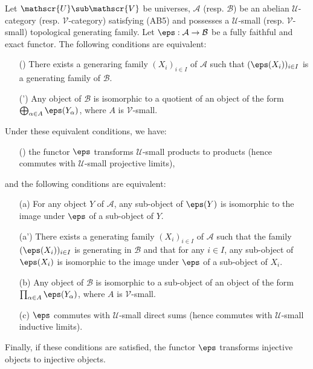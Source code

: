 \begin{proposition}\label{abelian category generaring family in universe prop}
Let $\mathscr{U}\sub\mathscr{V}$ be universes, $\mathcal{A}$ (resp. $\mathcal{B}$) be an abelian $\mathscr{U}$-category (resp. $\mathscr{V}$-category) satisfying (AB5) and possesses a $\mathscr{U}$-small (resp. $\mathscr{V}$-small) topological generating family. Let $\eps:\mathcal{A}\to \mathcal{B}$ be a fully faithful and exact functor. The following conditions are equivalent:
\begin{enumerate}
    \item[(\rmnum{1})] There exists a generaring family $(X_i)_{i\in I}$ of $\mathcal{A}$ such that $(\eps(X_i))_{i\in I}$ is a generating family of $\mathcal{B}$.
    \item[(\rmnum{1}')] Any object of $\mathcal{B}$ is isomorphic to a quotient of an object of the form $\bigoplus_{\alpha\in A}\eps(Y_\alpha)$, where $A$ is $\mathscr{V}$-small.
\end{enumerate}
Under these equivalent conditions, we have:
\begin{enumerate}
    \item[(\rmnum{2})] the functor $\eps$ transforms $\mathscr{U}$-small products to products (hence commutes with $\mathscr{U}$-small projective limits),
\end{enumerate}
and the following conditions are equivalent:
\begin{enumerate}
    \item[(a)] For any object $Y$ of $\mathcal{A}$, any sub-object of $\eps(Y)$ is isomorphic to the image under $\eps$ of a sub-object of $Y$.
    \item[(a')] There exists a generating family $(X_i)_{i\in I}$ of $\mathcal{A}$ such that the family $(\eps(X_i))_{i\in I}$ is generating in $\mathcal{B}$ and that for any $i\in I$, any sub-object of $\eps(X_i)$ is isomorphic to the image under $\eps$ of a sub-object of $X_i$.
    \item[(b)] Any object of $\mathcal{B}$ is isomorphic to a sub-object of an object of the form $\prod_{\alpha\in A}\eps(Y_\alpha)$, where $A$ is $\mathscr{V}$-small.
    \item[(c)] $\eps$ commutes with $\mathscr{U}$-small direct sums (hence commutes with $\mathscr{U}$-small inductive limits).
\end{enumerate}
Finally, if these conditions are satisfied, the functor $\eps$ transforms injective objects to injective objects.
\end{proposition}

